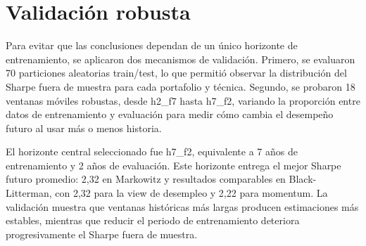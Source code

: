 \section{Validaci\'on robusta}

Para evitar que las conclusiones dependan de un \'unico horizonte de entrenamiento, se aplicaron dos mecanismos de validaci\'on. Primero, se evaluaron 70 particiones aleatorias train/test, lo que permiti\'o observar la distribuci\'on del Sharpe fuera de muestra para cada portafolio y t\'ecnica. Segundo, se probaron 18 ventanas m\'oviles robustas, desde h2\_f7 hasta h7\_f2, variando la proporci\'on entre datos de entrenamiento y evaluaci\'on para medir c\'omo cambia el desempe\~no futuro al usar m\'as o menos historia.

El horizonte central seleccionado fue h7\_f2, equivalente a 7 a\~nos de entrenamiento y 2 a\~nos de evaluaci\'on. Este horizonte entrega el mejor Sharpe futuro promedio: 2,32 en Markowitz y resultados comparables en Black-Litterman, con 2,32 para la view de desempleo y 2,22 para momentum. La validaci\'on muestra que ventanas hist\'oricas m\'as largas producen estimaciones m\'as estables, mientras que reducir el periodo de entrenamiento deteriora progresivamente el Sharpe fuera de muestra.
